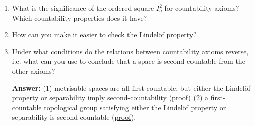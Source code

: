 \begin{enumerate}
    \item What is the significance of the ordered square \( I_o^2 \) for countability axioms? Which countability properties does it have?
    \item How can you make it easier to check the Lindel\"of property?
    \item Under what conditions do the relations between countability axioms reverse, i.e. what can you use to conclude that a space is second-countable from the other axioms?
    
        \textbf{Answer:} (1) metrisable spaces are all first-countable, but either the Lindel\"of property or separability imply second-countability (\hyperlink{MetrisableSpaceCountabilityProperties}{proof}) (2) a first-countable topological group satisfying either the Lindel\"of property or separability is second-countable (\hyperlink{MunkresP30.18}{proof}).
\end{enumerate}

